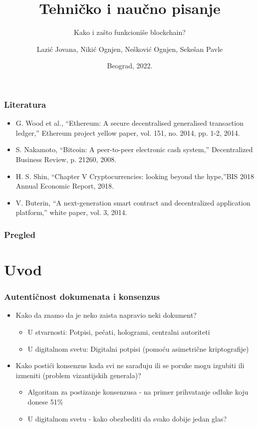 \documentclass{beamer}
\title{Tehničko i naučno pisanje}
\subtitle{Kako i zašto funkcioniše blockchain?}
\author{Lazić Jovana, Nikić Ognjen, Nešković Ognjen, Sekešan Pavle}
\institute{Matematički fakultet\\Univerzitet u Beogradu}
\date{
	\footnotesize{Beograd, 2022.}	
}
\begin{document}
\begin{frame}
	\thispagestyle{empty}
	\titlepage
\end{frame}

\addtocounter{framenumber}{-1}

\begin{frame}[fragile]\frametitle{Literatura}
	\begin{itemize}
		\item G. Wood et al., “Ethereum: A secure decentralised generalised transaction ledger,” Ethereum project yellow paper, vol. 151, no. 2014, pp. 1-2, 2014.
		\item S. Nakamoto, “Bitcoin: A peer-to-peer electronic cash system,” Decentralized Business Review, p. 21260, 2008.
		\item H. S. Shin, “Chapter V Cryptocurrencies: looking beyond the hype,”BIS 2018 Annual Economic Report, 2018.
		\item V. Buterin, “A next-generation smart contract and decentralized application platform,” white paper, vol. 3, 2014.
	\end{itemize}
\end{frame}

\begin{frame}
	\frametitle{Pregled} %
	\tableofcontents[hidesubsections] 
\end{frame}

\section{Uvod}

\begin{frame}[fragile]\frametitle{Autentičnost dokumenata i konsenzus}
	\begin{itemize}
		\item Kako da znamo da je neko zaista napravio neki dokument?
		\begin{itemize}
			\item U stvarnosti: Potpisi, pečati, hologrami, centralni autoriteti 
			\item U digitalnom svetu: Digitalni potpisi (pomoću asimetrične kriptografije) 
		\end{itemize}
		\item Kako postići konsenzus kada svi ne sarađuju ili se poruke mogu izgubiti ili izmeniti (problem vizantijskih generala)?
		\begin{itemize}
			\item Algoritam za postizanje konsenzusa - na primer prihvatanje odluke koju donese 51\%
			\item U digitalnom svetu - kako obezbediti da svako dobije jedan glas?
		\end{itemize}

	\end{itemize}
\end{frame}
\end{document}
